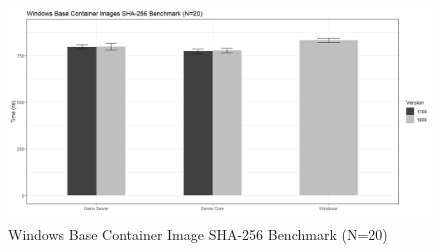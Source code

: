 \begin{figure}[h]
	\captionsetup{width=0.8\linewidth}
	\includegraphics[width=0.9\linewidth]{img/Methodologie/Containers2.png}
	\centering
	\caption{Windows Base Container Image SHA-256 Benchmark (N=20)}
	\label{fig:SHA_20}
\end{figure}